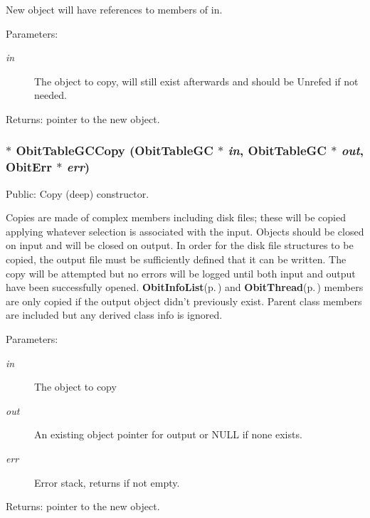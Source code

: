 New object will have references to members of in. \begin{Desc}
\item[Parameters:]
\begin{description}
\item[{\em in}]The object to copy, will still exist afterwards and should be Unrefed if not needed. \end{description}
\end{Desc}
\begin{Desc}
\item[Returns:]pointer to the new object. \end{Desc}
\subsubsection{$\ast$ Obit\-Table\-GCCopy ({\bf Obit\-Table\-GC} $\ast$ {\em in}, {\bf Obit\-Table\-GC} $\ast$ {\em out}, {\bf Obit\-Err} $\ast$ {\em err})}\label{ObitTableGC_8c_a20}


Public: Copy (deep) constructor. 

Copies are made of complex members including disk files; these will be copied applying whatever selection is associated with the input. Objects should be closed on input and will be closed on output. In order for the disk file structures to be copied, the output file must be sufficiently defined that it can be written. The copy will be attempted but no errors will be logged until both input and output have been successfully opened. {\bf Obit\-Info\-List}{\rm (p.\,\pageref{structObitInfoList})} and {\bf Obit\-Thread}{\rm (p.\,\pageref{structObitThread})} members are only copied if the output object didn't previously exist. Parent class members are included but any derived class info is ignored. \begin{Desc}
\item[Parameters:]
\begin{description}
\item[{\em in}]The object to copy \item[{\em out}]An existing object pointer for output or NULL if none exists. \item[{\em err}]Error stack, returns if not empty. \end{description}
\end{Desc}
\begin{Desc}
\item[Returns:]pointer to the new object. \end{Desc}
